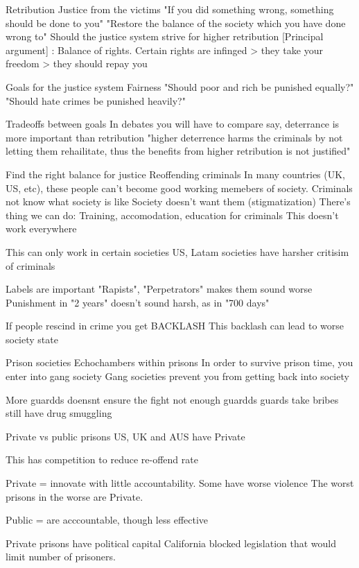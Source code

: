 		Retribution
			Justice from the victims
				"If you did something wrong, something should be done to you"
				"Restore the balance of the society which you have done wrong to"
			Should the justice system strive for higher retribution
				[Principal argument] : Balance of rights. Certain rights are infinged > they take your freedom > they should repay you


	Goals for the justice system
		Fairness
			"Should poor and rich be punished equally?"
			"Should hate crimes be punished heavily?"


	Tradeoffs between goals
		In debates you will have to compare say, deterrance is more important than retribution
			"higher deterrence harms the criminals by not letting them rehailitate, thus the benefits from higher retribution is not justified"

	Find the right balance for justice
		Reoffending criminals
			In many countries (UK, US, etc), these people can't become good working memebers of society.
				Criminals not know what society is like
				Society doesn't want them (stigmatization)
			There's thing we can do:
				Training, accomodation, education for criminals
				This doesn't work everywhere		
			
			This can only work in certain societies
				US, Latam societies have harsher critisim of criminals

				Labels are important
					"Rapists", "Perpetrators" makes them sound worse
					Punishment in "2 years" doesn't sound harsh, as in "700 days"

				If people rescind in crime you get BACKLASH
					This backlash can lead to worse society state

	Prison societies
		Echochambers within prisons
			In order to survive prison time, you enter into gang society
				Gang societies prevent you from getting back into society

			More guardds doensnt ensure the fight
				not enough guardds
				guards take bribes
					still have drug smuggling

		Private vs public prisons
			US, UK and AUS have Private

			This has competition to reduce re-offend rate

			Private = innovate with little accountability. Some have worse violence
				The worst prisons in the worse are Private.
			
			Public = are acccountable, though less effective

			Private prisons have political capital
				California blocked legislation that would limit number of prisoners.


